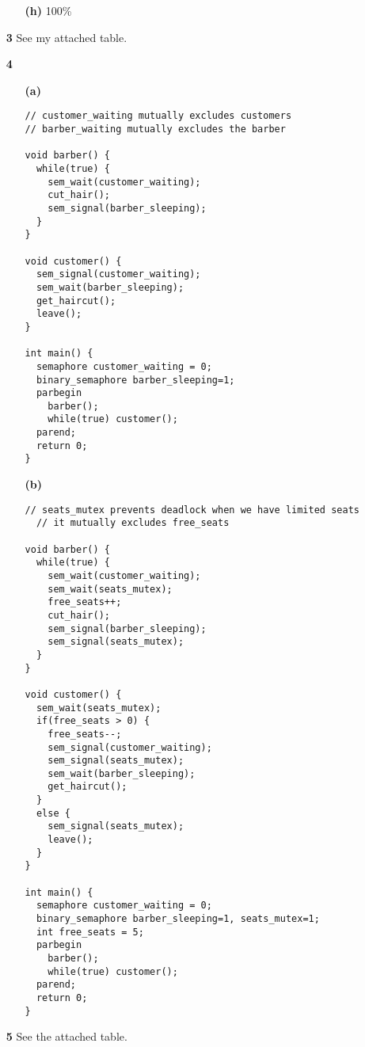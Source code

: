 \documentclass{article}
\begin{document}
\begin{enumerate}
\begin{enumerate}
  \item[\textbf{(h)}]
   100\%

 \end{enumerate}

\item[\textbf{3}]
 See my attached table. 

\item[\textbf{4}]
\begin{enumerate}
\item[\textbf{(a)}]
\begin{verbatim}
// customer_waiting mutually excludes customers
// barber_waiting mutually excludes the barber 

void barber() {
  while(true) {
    sem_wait(customer_waiting);
    cut_hair();
    sem_signal(barber_sleeping);
  }
}

void customer() {
  sem_signal(customer_waiting);
  sem_wait(barber_sleeping);
  get_haircut();
  leave();
}

int main() {
  semaphore customer_waiting = 0;
  binary_semaphore barber_sleeping=1;
  parbegin
    barber();
    while(true) customer();
  parend;
  return 0;
}
\end{verbatim}
\item[\textbf{(b)}]
\begin{verbatim}
// seats_mutex prevents deadlock when we have limited seats
  // it mutually excludes free_seats

void barber() {
  while(true) {
    sem_wait(customer_waiting);
    sem_wait(seats_mutex);
    free_seats++;
    cut_hair();
    sem_signal(barber_sleeping);
    sem_signal(seats_mutex);
  }
}

void customer() {
  sem_wait(seats_mutex);
  if(free_seats > 0) {
    free_seats--;     
    sem_signal(customer_waiting);
    sem_signal(seats_mutex);
    sem_wait(barber_sleeping);
    get_haircut();
  }
  else {
    sem_signal(seats_mutex);
    leave();
  }
}

int main() {
  semaphore customer_waiting = 0;
  binary_semaphore barber_sleeping=1, seats_mutex=1;
  int free_seats = 5;
  parbegin
    barber();
    while(true) customer();
  parend;
  return 0;
}
\end{verbatim}

\end{enumerate}

\item[\textbf{5}]
See the attached table.

\end{enumerate}
\end{document}
